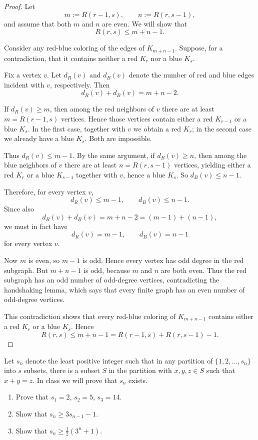 \documentclass[11pt, a4paper]{ctexrep}
\begin{document}
\begin{proof}
    Let
    \[
        m:=R(r-1,s),\qquad n:=R(r,s-1),
    \]
    and assume that both $m$ and $n$ are even. We will show that
    \[
        R(r,s)\le m+n-1.
    \]

    Consider any red-blue coloring of the edges of $K_{m+n-1}$. Suppose, for a contradiction, that it contains neither a red $K_r$ nor a blue $K_s$.

    Fix a vertex $v$. Let $d_R(v)$ and $d_B(v)$ denote the number of red and blue edges incident with $v$, respectively. Then
    \[
        d_R(v)+d_B(v)=m+n-2.
    \]

    If $d_R(v)\ge m$, then among the red neighbors of $v$ there are at least $m=R(r-1,s)$ vertices. Hence those vertices contain either a red $K_{r-1}$ or a blue $K_s$. In the first case, together with $v$ we obtain a red $K_r$; in the second case we already have a blue $K_s$. Both are impossible.

    Thus $d_R(v)\le m-1$. By the same argument, if $d_B(v)\ge n$, then among the blue neighbors of $v$ there are at least $n=R(r,s-1)$ vertices, yielding either a red $K_r$ or a blue $K_{s-1}$ together with $v$, hence a blue $K_s$. So $d_B(v)\le n-1$.

    Therefore, for every vertex $v$,
    \[
        d_R(v)\le m-1,\qquad d_B(v)\le n-1.
    \]
    Since also
    \[
        d_R(v)+d_B(v)=m+n-2=(m-1)+(n-1),
    \]
    we must in fact have
    \[
        d_R(v)=m-1,\qquad d_B(v)=n-1
    \]
    for every vertex $v$.

    Now $m$ is even, so $m-1$ is odd. Hence every vertex has odd degree in the red subgraph. But $m+n-1$ is odd, because $m$ and $n$ are both even. Thus the red subgraph has an odd number of odd-degree vertices, contradicting the handshaking lemma, which says that every finite graph has an even number of odd-degree vertices.

    This contradiction shows that every red-blue coloring of $K_{m+n-1}$ contains either a red $K_r$ or a blue $K_s$. Hence
    \[
        R(r,s)\le m+n-1
        =R(r-1,s)+R(r,s-1)-1.
    \]
\end{proof}

\begin{exercise}
    Let $s_n$ denote the least positive integer such that in any partition of $\{1, 2, \ldots, s_n\}$ into $s$ subsets, there is a subset $S$ in the partition with $x, y, z \in S$ such that $x + y = z$. In class we will prove that $s_n$ exists.
    \begin{enumerate}
        \item[(i)] Prove that $s_1 = 2$, $s_2 = 5$, $s_3 = 14$.
        \item[(ii)] Show that $s_n \geq 3 s_{n-1} - 1$.
        \item[(iii)] Show that $s_n \geq \frac{1}{2}(3^n + 1)$.
    \end{enumerate}
\end{exercise}
\end{document}
